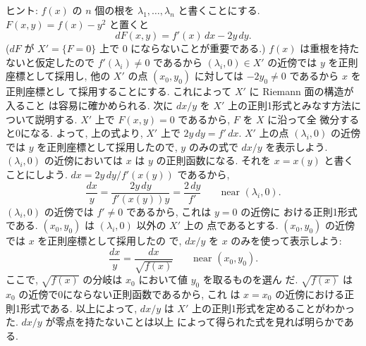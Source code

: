 \documentclass[12pt,twoside]{jarticle}
\begin{document}
\noindent ヒント: $f(x)$ の $n$ 個の根を $\lambda_1,\dots,\lambda_n$ 
と書くことにする. $F(x,y)=f(x)-y^2$ と置くと
\[
  dF(x,y) = f'(x)\,dx - 2y\,dy.
\] %
($dF$ が $X'=\{F=0\}$ 上で $0$ にならないことが重要である.) %
$f(x)$ は重根を持たないと仮定したので $f'(\lambda_i)\ne 0$ であるから %
$(\lambda_i,0)\in X'$ の近傍では $y$ を正則座標として採用し, 他の $X'$ 
の点 $(x_0,y_0)$ に対しては $-2y_0\ne0$ であるから $x$ を正則座標とし
て採用することにする. これによって $X'$ に Riemann 面の構造が入ること
は容易に確かめられる. 次に $dx/y$ を $X'$ 上の正則1形式とみなす方法に
ついて説明する. $X'$ 上で $F(x,y)=0$ であるから, $F$ を $X$ に沿って全
微分すると0になる. よって, 上の式より, $X'$ 上で $2y\,dy = f'\,dx$. %
$X'$ 上の点 $(\lambda_i,0)$ の近傍では $y$ を正則座標として採用したので,
$y$ のみの式で $dx/y$ を表示しよう. $(\lambda_i,0)$ の近傍においては 
$x$ は $y$ の正則函数になる. それを $x=x(y)$ と書くことにしよう. 
$dx= 2y\,dy/f'(x(y))$ であるから,
\[
  \frac{dx}{y}
  = \frac{2y\,dy}{f'(x(y))y}
  = \frac{2\,dy}{f'}
  \qquad
  \text{near $(\lambda_i,0)$.}
\]
$(\lambda_i,0)$ の近傍では $f'\ne0$ であるから, これは $y=0$ の近傍に
おける正則1形式である. $(x_0,y_0)$ は $(\lambda_i,0)$ 以外の $X'$ 上の
点であるとする. $(x_0,y_0)$ の近傍では $x$ を正則座標として採用したの
で, $dx/y$ を $x$ のみを使って表示しよう:
\[
  \frac{dx}{y}
  = \frac{dx}{\sqrt{f(x)}}
  \qquad
  \text{near $(x_0,y_0)$}.
\] %
ここで, $\sqrt{f(x)}$ の分岐は $x_0$ において値 $y_0$ を取るものを選ん
だ. $\sqrt{f(x)}$ は $x_0$ の近傍で0にならない正則函数であるから, これ
は $x=x_0$ の近傍における正則1形式である. 以上によって, $dx/y$ は $X'$
上の正則1形式を定めることがわかった. $dx/y$ が零点を持たないことは以上
によって得られた式を見れば明らかである.

\medskip
\end{document}
